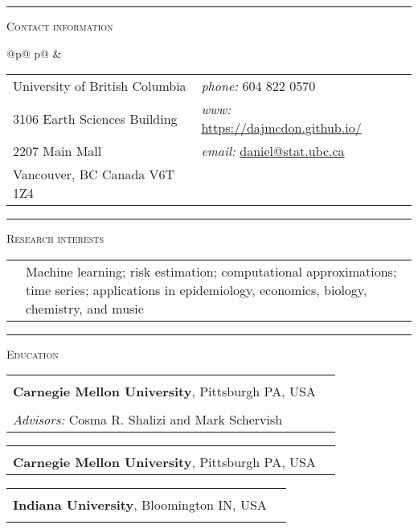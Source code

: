 \documentclass[11pt,letterpaper]{minimal/moderncv}
\makeatletter
\newcommand{\jog}{\hspace*{2ex}}
\renewcommand{\cventry}[2]{\cvitem{#1}{\begin{minipage}[t]{\maincolumnwidth}#2\end{minipage}}}
\renewcommand{\section}[1]{  \par\addvspace{15pt}%
  \parbox[t]{\hintscolumnwidth}{\strut\raggedleft\raisebox{4pt}%
  {\rule{\hintscolumnwidth}{2pt}}}%
  \hspace{\separatorcolumnwidth}%
  \textsc{\Large #1}\par\nobreak\addvspace{6pt}%
}
\renewcommand*{\cvitem}[2]{%
  \begin{tabular}{@{}p{\hintscolumnwidth}@{\hspace{\separatorcolumnwidth}}%
    p{\maincolumnwidth}@{}}%
    \raggedleft {#1} &  {#2}%
  \end{tabular}%
}
\makeatother
\begin{document}
\maketitle
\vspace*{-20pt}



\section{Contact information}
\cvitem{}{%
  \begin{tabular}{@{}p{3in}p{2.75in}p{.25in}@{}}
    University of British Columbia & \emph{phone:} 604 822 0570\\
    3106 Earth Sciences Building & \emph{www:} \href{https://dajmcdon.github.io}{https://dajmcdon.github.io/}\\
    2207 Main Mall & \emph{email:} \href{mailto:dajmcdon@indiana.edu}{daniel@stat.ubc.ca}\\ 
    Vancouver, BC Canada V6T 1Z4
  \end{tabular}
}

\section{Research interests}
\cvitem{}{Machine learning; risk estimation; computational approximations; time
series; applications in epidemiology, economics, biology, chemistry, and music} 

\section{Education}
\cventry{2012}{Doctor of Philosophy in Statistics\\ \textbf{Carnegie Mellon
University}, Pittsburgh PA,
USA\\{\small
\jog\emph{Dissertation:} ``Generalization error bounds for state space
models''\\ 
\jog\emph{Advisors:} Cosma R. Shalizi and Mark Schervish}} 

\vspace{3pt}
\cventry{2008}{Master of Science in Statistics\\ \textbf{Carnegie Mellon
University}, Pittsburgh PA, USA} 

\vspace{3pt}
\cventry{2006}{Bachelor of Arts in Economics\\
\textbf{Indiana University}, Bloomington IN, USA \\\jog{\small Summa cum
laude}} 
\end{document}
